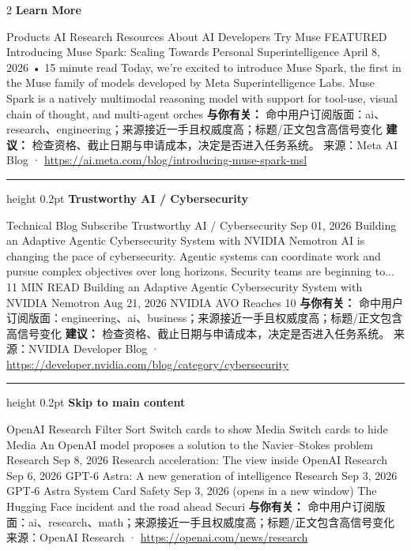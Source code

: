 \documentclass[10.5pt]{ctexart}
\begin{document}
\begin{multicols}{2}
{\large\bfseries Learn More}\par
Products AI Research Resources About AI Developers Try Muse FEATURED Introducing Muse Spark: Scaling Towards Personal Superintelligence April 8, 2026 • 15 minute read Today, we’re excited to introduce Muse Spark, the first in the Muse family of models developed by Meta Superintelligence Labs. Muse Spark is a natively multimodal reasoning model with support for tool-use, visual chain of thought, and multi-agent orches
\textbf{与你有关：} 命中用户订阅版面：ai、research、engineering；来源接近一手且权威度高；标题/正文包含高信号变化
\textbf{建议：} 检查资格、截止日期与申请成本，决定是否进入任务系统。
{\footnotesize\color{ormuted} 来源：Meta AI Blog · \url{https://ai.meta.com/blog/introducing-muse-spark-msl}}
\vspace{2mm}
\hrule height 0.2pt
\vspace{2mm}
{\large\bfseries Trustworthy AI / Cybersecurity}\par
Technical Blog Subscribe Trustworthy AI / Cybersecurity Sep 01, 2026 Building an Adaptive Agentic Cybersecurity System with NVIDIA Nemotron AI is changing the pace of cybersecurity. Agentic systems can coordinate work and pursue complex objectives over long horizons. Security teams are beginning to... 11 MIN READ Building an Adaptive Agentic Cybersecurity System with NVIDIA Nemotron Aug 21, 2026 NVIDIA AVO Reaches 10
\textbf{与你有关：} 命中用户订阅版面：engineering、ai、business；来源接近一手且权威度高；标题/正文包含高信号变化
\textbf{建议：} 检查资格、截止日期与申请成本，决定是否进入任务系统。
{\footnotesize\color{ormuted} 来源：NVIDIA Developer Blog · \url{https://developer.nvidia.com/blog/category/cybersecurity}}
\vspace{2mm}
\hrule height 0.2pt
\vspace{2mm}
{\large\bfseries Skip to main content}\par
OpenAI Research Filter Sort Switch cards to show Media Switch cards to hide Media An OpenAI model proposes a solution to the Navier–Stokes problem Research Sep 8, 2026 Research acceleration: The view inside OpenAI Research Sep 6, 2026 GPT-6 Astra: A new generation of intelligence Research Sep 3, 2026 GPT‑6 Astra System Card Safety Sep 3, 2026 (opens in a new window) The Hugging Face incident and the road ahead Securi
\textbf{与你有关：} 命中用户订阅版面：ai、research、math；来源接近一手且权威度高；标题/正文包含高信号变化
{\footnotesize\color{ormuted} 来源：OpenAI Research · \url{https://openai.com/news/research}}

\end{multicols}
\end{document}
